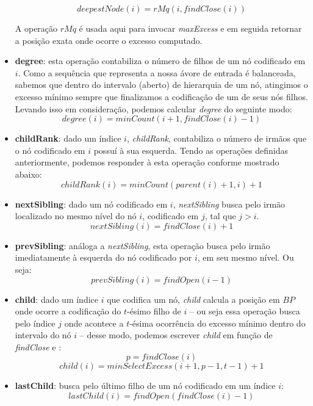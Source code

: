 \begin{itemize}
        $$deepestNode(i) = rMq(i, findClose(i))$$

        A operação $rMq$ é usada aqui para invocar \textit{maxExcess} e em seguida retornar a posição exata onde ocorre o excesso computado.

        \item \textbf{degree}: esta operação contabiliza o número de filhos de um nó codificado em $i$. Como a sequência que representa a nossa ávore de entrada é balanceada, sabemos que dentro do intervalo (aberto) de hierarquia de um nó, atingimos o excesso mínimo sempre que finalizamos a codificação de um de seus nós filhos. Levando isso em consideração, podemos calcular \textit{degree} do seguinte modo:
        $$degree(i) = minCount(i+1, findClose(i)-1)$$
        
        \item \textbf{childRank}: dado um índice $i$, \textit{childRank}, contabiliza o número de irmãos que o nó codificado em $i$ possuí à sua esquerda. Tendo as operações definidas anteriormente, podemos responder à esta operação conforme mostrado abaixo:
        $$
               childRank(i) = minCount(parent(i)+1, i) +1
        $$
        
        \item \textbf{nextSibling}: dado um nó codificado em $i$, \textit{nextSibling} busca pelo irmão localizado no mesmo nível do nó $i$, codificado em $j$, tal que $j>i$.
        $$nextSibling(i) = findClose(i) +1$$
        
        \item \textbf{prevSibling}: análoga a \textit{nextSibling}, esta operação busca pelo irmão imediatamente à esquerda do nó codificado por $i$, em seu mesmo nível. Ou seja:
        $$prevSibling(i) = findOpen(i-1)$$
        
        \item \textbf{child}: dado um índice $i$ que codifica um nó, \textit{child} calcula a posição em $BP$ onde ocorre a codificação do $t$-ésimo filho de $i$  -- ou seja essa operação busca pelo índice $j$ onde acontece a $t$-ésima ocorrência do excesso mínimo dentro do intervalo do nó $i$ --  desse modo, podemos escrever
        \textit{child} em função de \textit{findClose} e :
        $$p = findClose(i)$$
        $$child(i) = minSelectExcess(i+1,p-1,t-1) + 1 $$

        \item \textbf{lastChild}: busca pelo último filho de um nó codificado em um índice $i$:
        $$lastChild(i) = findOpen(findClose(i)-1)$$
        

\end{itemize}
